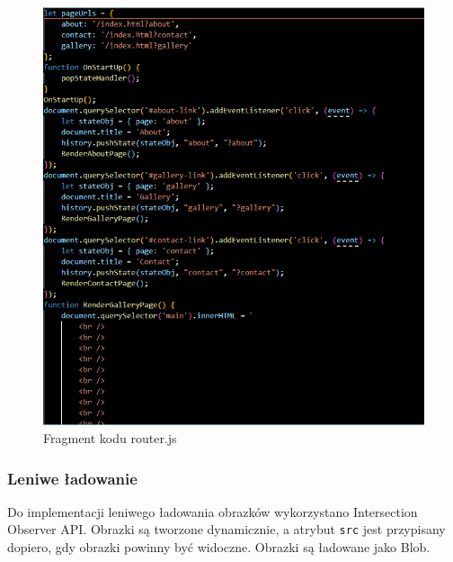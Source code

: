 \documentclass[a4paper,12pt]{article}
\begin{document}
\begin{figure}[H]
    \centering
    \includegraphics[width=1\textwidth]{images/js.png}
    \caption{Fragment kodu router.js}
\end{figure}

\subsubsection{Leniwe ładowanie}

Do implementacji leniwego ładowania obrazków wykorzystano Intersection Observer API. Obrazki są tworzone dynamicznie, a atrybut \texttt{src} jest przypisany dopiero, gdy obrazki powinny być widoczne. Obrazki są ładowane jako Blob.
\end{document}
